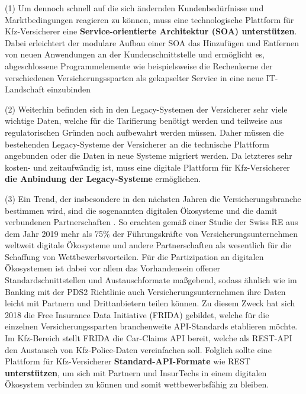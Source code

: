 
(1) Um dennoch schnell auf die sich ändernden Kundenbedürfnisse und Marktbedingungen reagieren zu können, muss eine technologische Plattform für Kfz-Versicherer eine \textbf{Service-orientierte Architektur (SOA) unterstützen}. Dabei erleichtert der modulare Aufbau einer SOA das Hinzufügen und Entfernen von neuen Anwendungen an der Kundenschnittstelle \autocite[Vgl.][S. 392]{WARG2016} und ermöglicht es, abgeschlossene Programmelemente wie beispielsweise die Rechenkerne der verschiedenen Versicherungssparten als gekapselter Service in eine neue IT-Landschaft einzubinden \autocite[Vgl.][S. 10f]{URLA2019}

(2) Weiterhin befinden sich in den Legacy-Systemen der Versicherer sehr viele wichtige Daten, welche für die Tarifierung benötigt werden und teilweise aus regulatorischen Gründen noch aufbewahrt werden müssen. Daher müssen die bestehenden Legacy-Systeme der Versicherer an die technische Plattform angebunden oder die Daten in neue Systeme migriert werden. Da letzteres sehr kosten- und zeitaufwändig ist, muss eine digitale Plattform für Kfz-Versicherer \textbf{die Anbindung der Legacy-Systeme} ermöglichen. \autocite[Vgl.][S. 10-12]{GUNTER2020}

(3) Ein Trend, der insbesondere in den nächsten Jahren die Versicherungsbranche bestimmen wird, sind die sogenannten digitalen Ökosysteme und die damit verbundenen Partnerschaften \autocite[Vgl.][]{AVRAMAKIS2023}.  So erachten gemäß einer Studie der Swiss RE aus dem Jahr 2019 mehr als 75\% der Führungskräfte von Versicherungsunternehmen weltweit digitale Ökosysteme und andere Partnerschaften als wesentlich für die Schaffung von Wettbewerbsvorteilen. \autocite[Vgl.][]{PAYNE2022} Für die Partizipation an digitalen Ökosystemen ist dabei vor allem das Vorhandensein offener Standardschnittstellen und Austauschformate maßgebend, sodass ähnlich wie im Banking mit der PDS2 Richtlinie auch Versicherungsunternehmen ihre Daten leicht mit Partnern und Drittanbietern teilen können. Zu diesem Zweck hat sich 2018 \autocite[Vgl.][]{2021z} die Free Insurance Data Initiative (FRIDA) gebildet, welche für die einzelnen Versicherungssparten branchenweite API-Standards etablieren möchte. Im Kfz-Bereich stellt FRIDA die Car-Claims API bereit, welche als REST-API den Austausch von Kfz-Police-Daten vereinfachen soll. Folglich sollte eine Plattform für Kfz-Versicherer \textbf{Standard-API-Formate} wie REST \textbf{unterstützen}, um sich mit Partnern und InsurTechs in einem digitalen Ökosystem verbinden zu können und somit wettbewerbsfähig zu bleiben. \autocite[Vgl.][]{KRETZ2023}


